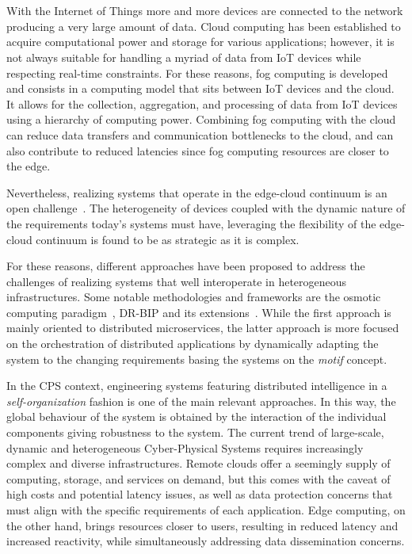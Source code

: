 \chapter{\introductionname}
\label{chap:introduction}

With the Internet of Things more and more devices are connected to the network producing a very large amount of data. Cloud computing has been
established to acquire computational power and storage for various applications; however, it is not always suitable for handling a myriad of data
from IoT devices while respecting real-time constraints.
For these reasons, fog computing is developed and consists in a computing model that sits between IoT devices and the cloud.
It allows for the collection, aggregation, and processing of data from IoT devices using a hierarchy of computing power.
Combining fog computing with the cloud can reduce data transfers and communication bottlenecks to the cloud, and can also contribute to reduced
latencies since fog computing resources are closer to the edge.

Nevertheless, realizing systems that operate in the edge-cloud continuum is an open challenge~\cite{BITTENCOURT2018134}.
The heterogeneity of devices coupled with the dynamic nature of the requirements today's systems must have, leveraging the flexibility of the
edge-cloud continuum is found to be as strategic as it is complex.

For these reasons, different approaches have been proposed to address the challenges of realizing systems that well interoperate in heterogeneous
infrastructures. Some notable methodologies and frameworks are the osmotic computing paradigm~\cite{8781958}, DR-BIP and its
extensions~\cite{10.1007/978-3-030-03424-5_20,10.1007/978-3-642-30564-1_1,de2020dream}.
While the first approach is mainly oriented to distributed microservices, the latter approach is more focused on the orchestration of distributed
applications by dynamically adapting the system to the changing requirements basing the systems on the \emph{motif} concept.

In the CPS context, engineering systems featuring distributed intelligence in a \emph{self-organization} fashion is one of the main relevant
approaches. In this way, the global behaviour of the system is obtained by the interaction of the individual components giving robustness to the
system. The current trend of large-scale, dynamic and heterogeneous Cyber-Physical Systems requires increasingly complex and diverse
infrastructures. Remote clouds offer a seemingly supply of computing, storage, and services on demand, but this comes with the caveat of high
costs and potential latency issues, as well as data protection concerns that must align with the specific requirements of each application. Edge
computing, on the other hand, brings resources closer to users, resulting in reduced latency and increased reactivity, while simultaneously
addressing data dissemination concerns.

